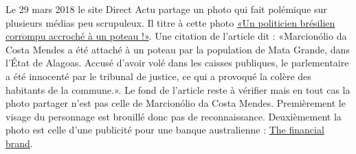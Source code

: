 \documentclass[11pt,a4paper,oldfontcommands]{memoir}
\begin{document}
Le 29 mars 2018 le site Direct Actu partage un photo qui fait polémique sur plusieurs médias peu scrupuleux.
Il titre à cette photo \href{http://www.directactu.net/2018/03/29/un-politicien-bresilien-corrompu-accroche-a-un-poteau/}{«Un politicien brésilien corrompu accroché à un poteau !»}.
Une citation de l'article dit : «Marcionólio da Costa Mendes a été attaché à un poteau par la population de Mata Grande, dans l’État de Alagoas. Accusé d’avoir volé dans les caisses publiques, le parlementaire a été innocenté par le tribunal de justice, ce qui a provoqué la colère des habitants de la commune.».
Le fond de l'article reste à vérifier mais en tout cas la photo partager n'est pas celle de Marcionólio da Costa Mendes.
Premièrement le visage du personnage est brouillé donc pas de reconnaissance.
Deuxièmement la photo est celle d'une publicité pour une banque australienne : \href{https://thefinancialbrand.com/19014/nab-guerilla-marketing-stunts/}{The financial brand}.
\end{document}
